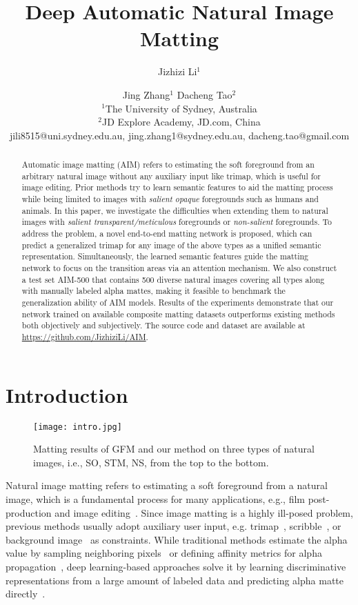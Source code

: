 \documentclass{article}
\title{Deep Automatic Natural Image Matting}
\author{
Jizhizi Li$^1$\and
Jing Zhang$^1$\And
Dacheng Tao$^{2}$\\
\affiliations
$^1$The University of Sydney, Australia\\
$^2$JD Explore Academy, JD.com, China\\
\emails
jili8515@uni.sydney.edu.au,
jing.zhang1@sydney.edu.au,
dacheng.tao@gmail.com
}
\begin{document}
\maketitle




\begin{abstract}
Automatic image matting (AIM) refers to estimating the soft foreground from an arbitrary natural image without any auxiliary input like trimap, which is useful for image editing. Prior methods try to learn semantic features to aid the matting process while being limited to images with \textit{salient opaque} foregrounds such as humans and animals. In this paper, we investigate the difficulties when extending them to natural images with \textit{salient transparent/meticulous} foregrounds or \textit{non-salient} foregrounds. To address the problem, a novel end-to-end matting network is proposed, which can predict a generalized trimap for any image of the above types as a unified semantic representation. Simultaneously, the learned semantic features guide the matting network to focus on the transition areas via an attention mechanism. We also construct a test set AIM-500 that contains 500 diverse natural images covering all types along with manually labeled alpha mattes, making it feasible to benchmark the generalization ability of AIM models. Results of the experiments demonstrate that our network trained on available composite matting datasets outperforms existing methods both objectively and subjectively. The source code and dataset are available at \href{https://github.com/JizhiziLi/AIM}{https://github.com/JizhiziLi/AIM}.
\end{abstract}



\section{Introduction}
\label{sec:introduction}

\begin{figure}[t]
    \texttt{[image: intro.jpg]}
    \caption{Matting results of GFM and our method on three types of natural images, i.e., SO, STM, NS, from the top to the bottom.}
    \label{fig:introduction}
\end{figure}

Natural image matting refers to estimating a soft foreground from a natural image, which is a fundamental process for many applications, e.g., film post-production and image editing~\cite{chen2013knn,zhang2020empowering}. Since image matting is a highly ill-posed problem, previous methods usually adopt auxiliary user input, e.g. trimap~\cite{sun2004poisson,cai2019disentangled}, scribble~\cite{levin2007closed}, or background image~\cite{backgroundmatting} as constraints. While traditional methods estimate the alpha value by sampling neighboring pixels~\cite{wang2007optimized} or defining affinity metrics for alpha propagation~\cite{levin2008spectral}, deep learning-based approaches solve it by learning discriminative representations from a large amount of labeled data and predicting alpha matte directly~\cite{lu2019indices,li2020natural}.
\end{document}
